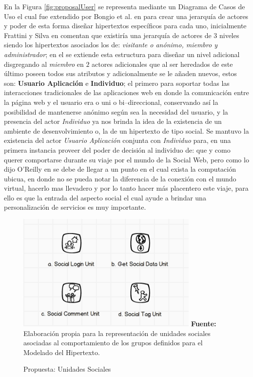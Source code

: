 \documentclass[oneside,12pt,a4paper]{memoir}%
\begin{document}
		En la Figura \ref{fig:proposalUser} se representa mediante un Diagrama de
		Casos de Uso el cual fue extendido por Bongio et al. en \cite{Ceri2003} para
		crear una jerarqu\'ia de actores y poder de esta forma dise\~nar hipertextos espec\'ificos para cada
		uno, inicialmente Frattini y Silva en \cite{Frattini2007} comentan que
		existir\'ia una jerarqu\'ia de actores de $3$ niveles siendo los hipertextos asociados los de:
		\textit{visitante o an\'onimo, miembro y administrador}; en el se
		extiende esta estructura para dise\~nar un nivel adicional
		disgregando al \textit{miembro} en $2$ actores adicionales que al ser
		heredados de este \'ultimo poseen todos sus atributos y adicionalmente se le a\~naden nuevos, estos son:
		\textbf{Usuario Aplicaci\'on} e \textbf{Individuo}; el primero para soportar
		todas las interacciones tradicionales de las aplicaciones web en donde la
		comunicaci\'on entre la p\'agina web y el usuario era o uni o bi--direccional,
		conservando as\'i la posibilidad de mantenerse an\'onimo seg\'un sea la
		necesidad del usuario, y la presencia del actor \textit{Individuo} ya nos
		brinda la idea de la existencia de un ambiente de desenvolvimiento o, la de un
		hipertexto de tipo social. Se mantuvo la existencia del actor \textit{Usuario
		Aplicaci\'on} conjunta con \textit{Individuo} para, en una primera instancia
		proveer del poder de decisi\'on al individuo de: que y como querer comportarse
		durante su viaje por el mundo de la Social Web, pero como lo dijo
		O'Reilly en \cite{OReilly2007} se debe de llegar a un punto en el cual exista
		la computaci\'on ubicua, en donde no se pueda notar la diferencia de la
		conexi\'on con el mundo virtual, hacerlo mas llevadero y por lo tanto hacer
		m\'as placentero este viaje, para ello es que la entrada del aspecto social el
		cual ayude a brindar una personalizaci\'on de servicios es muy importante.
		
		\begin{figure}[here]
			\centering 
			\caption{Propuesta: Unidades Sociales}
			\includegraphics[width=0.8\textwidth]{figure/fig_SocialUnits.png}
			\newline
			\textbf{Fuente:} Elaboraci\'on propia para la representaci\'on de
			unidades sociales asociadas al comportamiento de los grupos definidos
			para el Modelado del Hipertexto.
			\label{fig:proposalSocialUnits}
		\end{figure}
	
\end{document}
